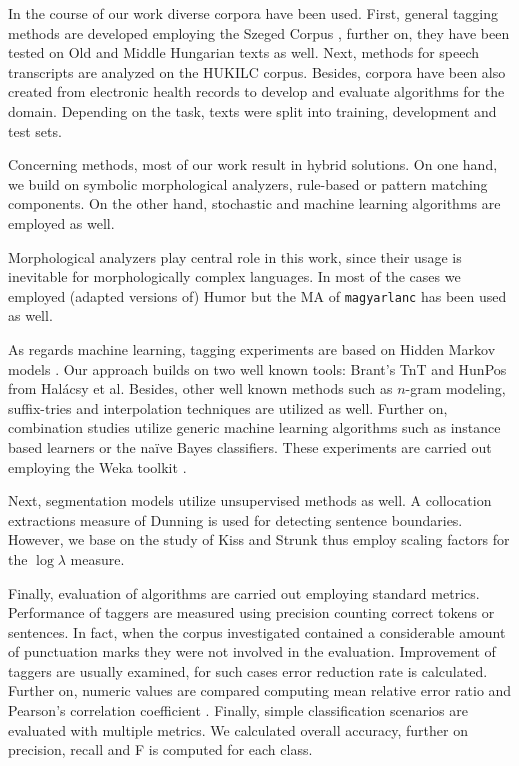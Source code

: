 In the course of our work diverse corpora have been used. 
First, general tagging methods are developed employing the Szeged Corpus \cite{Csendes2004}, further on, they have been tested on Old and Middle Hungarian \cite{Novak2013} texts as well.
Next, methods for speech transcripts are analyzed on the HUKILC corpus\cite{Matyus2014}.
Besides, corpora have been also created from electronic health records to develop and evaluate algorithms for the domain.
Depending on the task, texts were split into training, development and test sets.

Concerning methods, most of our work result in hybrid solutions.
On one hand, we build on symbolic morphological analyzers, rule-based or pattern matching components. 
On the other hand, stochastic and machine learning algorithms are employed as well.

Morphological analyzers play central role in this work, since their usage is inevitable for morphologically complex languages.
In most of the cases we employed (adapted versions \cite{Novak2013,Orosz2013} of) Humor \cite{Novak2003,Proszeky1994} but the MA of \texttt{magyarlanc} \cite{zsibrata2013magyarlanc} has been used as well.

As regards machine learning, tagging experiments are based on Hidden Markov models \cite{}. %
Our approach builds on two well known tools: Brant's TnT \cite{Brants2000} and HunPos \cite{Halacsy2007} from Halácsy et al. 
Besides, other well known methods such as $n$-gram modeling, suffix-tries and interpolation techniques are utilized as well.
Further on, combination studies utilize generic machine learning algorithms such as instance based learners or the naïve Bayes classifiers.
These experiments are carried out employing the Weka toolkit \cite{Hall2009}.

Next, segmentation models utilize unsupervised methods as well.
A collocation extractions measure of Dunning \cite{dunning1993accurate} is used for detecting sentence boundaries.
However, we base on the study of Kiss and Strunk \cite{kiss2006unsupervised} thus employ scaling factors for the $\log\lambda$ measure.

Finally, evaluation of algorithms are carried out employing standard metrics.
Performance of taggers are measured using precision counting correct tokens or sentences.
In fact, when the corpus investigated contained a considerable amount of punctuation marks they were not involved in the evaluation.
Improvement of taggers are usually examined, for such cases error reduction rate is calculated. %
Further on, numeric values are compared computing mean relative error \cite{Witten2011} ratio and Pearson's correlation coefficient \cite{Witten2011}.
Finally, simple classification scenarios are evaluated with multiple metrics.
We calculated overall accuracy, further on precision, recall and F is computed for each class.